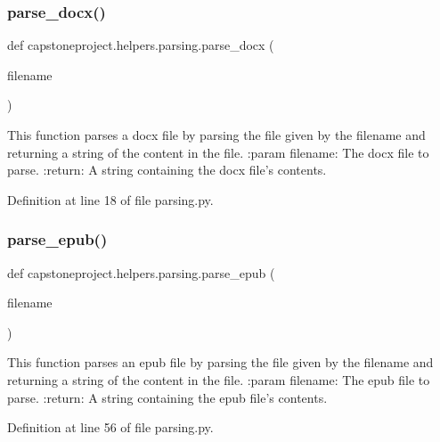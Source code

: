 \subsubsection{\texorpdfstring{parse\+\_\+docx()}{parse\_docx()}}
{\footnotesize\ttfamily def capstoneproject.\+helpers.\+parsing.\+parse\+\_\+docx (\begin{DoxyParamCaption}\item[{}]{filename }\end{DoxyParamCaption})}

\begin{DoxyVerb}This function parses a docx file by parsing the file given by the filename and returning a string of the
content in the file.
:param filename: The docx file to parse.
:return: A string containing the docx file's contents.
\end{DoxyVerb}
 

Definition at line 18 of file parsing.\+py.

\mbox{\label{namespacecapstoneproject_1_1helpers_1_1parsing_a5f5865532be60ee335c3d045aeb06a47}} 
\subsubsection{\texorpdfstring{parse\+\_\+epub()}{parse\_epub()}}
{\footnotesize\ttfamily def capstoneproject.\+helpers.\+parsing.\+parse\+\_\+epub (\begin{DoxyParamCaption}\item[{}]{filename }\end{DoxyParamCaption})}

\begin{DoxyVerb}This function parses an epub file by parsing the file given by the filename and returning a string of the content
in the file.
:param filename: The epub file to parse.
:return: A string containing the epub file's contents.
\end{DoxyVerb}
 

Definition at line 56 of file parsing.\+py.

\mbox{\label{namespacecapstoneproject_1_1helpers_1_1parsing_aaedb4fff5ed35e366bded59afca0c56f}} 
